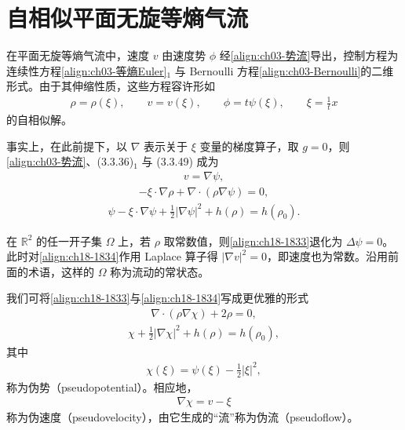 \documentclass[../../main.tex]{subfiles}
\begin{document}
\section{自相似平面无旋等熵气流}\label{section:ch18-自相似无旋等熵气流}

在平面无旋等熵气流中，速度 $v$ 由速度势 $\phi$ 经\eqref{align:ch03-势流}导出，控制方程为连续性方程\eqref{align:ch03-等熵Euler}$_1$ 与 Bernoulli 方程\eqref{align:ch03-Bernoulli}的二维形式。由于其伸缩性质，这些方程容许形如
\begin{align}
\rho=\rho(\xi),\qquad v=v(\xi),\qquad \phi=t\psi(\xi),\qquad \xi=\frac1t x
\label{align:ch18-1831}
\end{align}
的自相似解。

事实上，在此前提下，以 $\nabla$ 表示关于 $\xi$ 变量的梯度算子，取 $g=0$，则\eqref{align:ch03-势流}、(3.3.36)$_1$ 与 (3.3.49) 成为
\begin{align}
v=\nabla\psi,
\label{align:ch18-1832}
\end{align}
\begin{align}
-\xi\cdot\nabla\rho+\nabla\cdot(\rho\nabla\psi)=0,
\label{align:ch18-1833}
\end{align}
\begin{align}
\psi-\xi\cdot\nabla\psi+\frac12|\nabla\psi|^2+h(\rho)=h(\rho_0).
\label{align:ch18-1834}
\end{align}

在 $\mathbb{R}^2$ 的任一开子集 $\Omega$ 上，若 $\rho$ 取常数值，则\eqref{align:ch18-1833}退化为 $\Delta\psi=0$。此时对\eqref{align:ch18-1834}作用 Laplace 算子得 $|\nabla v|^2=0$，即速度也为常数。沿用前面的术语，这样的 $\Omega$ 称为流动的常状态。

我们可将\eqref{align:ch18-1833}与\eqref{align:ch18-1834}写成更优雅的形式
\begin{align}
\nabla\cdot(\rho\nabla\chi)+2\rho=0,
\label{align:ch18-1835}
\end{align}
\begin{align}
\chi+\frac12|\nabla\chi|^2+h(\rho)=h(\rho_0),
\label{align:ch18-1836}
\end{align}
其中
\begin{align}
\chi(\xi)=\psi(\xi)-\frac12|\xi|^2,
\label{align:ch18-1837}
\end{align}
称为伪势（pseudopotential）。相应地，
\begin{align}
\nabla\chi=v-\xi
\label{align:ch18-1838}
\end{align}
称为伪速度（pseudovelocity），由它生成的“流”称为伪流（pseudoflow）。
\end{document}
